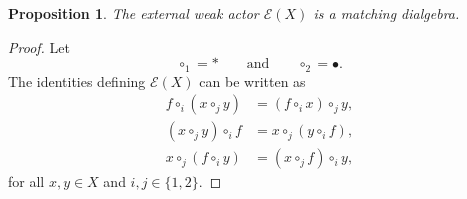 \documentclass[reqno,a4paper]{amsart}
\theoremstyle{plain}
\newtheorem{proposition}[subsection]{Proposition}
\theoremstyle{definition}
\theoremstyle{remark}
\numberwithin{equation}{section}
\newcommand{\E}{\mathcal{E}}
\begin{document}
\begin{proposition}\label{PropExternalMatching}
The external weak actor $\E(X)$ is a matching dialgebra.
\end{proposition}

\begin{proof}
Let
\[
\circ_1=\ast
\qquad\text{and}\qquad
\circ_2=\bullet.
\]
The identities defining $\E(X)$ can be written as
\begin{align}
f\circ_i(x\circ_j y)&=(f\circ_i x)\circ_j y, \label{EqMatchingUniform1}\\
(x\circ_j y)\circ_i f&=x\circ_j(y\circ_i f), \label{EqMatchingUniform2}\\
x\circ_j(f\circ_i y)&=(x\circ_j f)\circ_i y, \label{EqMatchingUniform3}
\end{align}
for all $x,y\in X$ and $i,j\in\{1,2\}$.


\end{proof}
\end{document}
